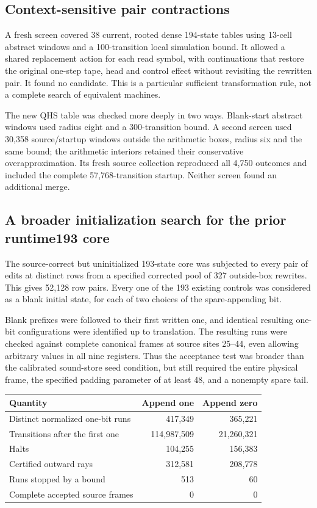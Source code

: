 \subsection{Context-sensitive pair contractions}

A fresh screen covered 38 current, rooted dense 194-state tables using
13-cell abstract windows and a 100-transition local simulation bound.
It allowed a shared replacement action for each read symbol, with
continuations that restore the original one-step tape, head and control
effect without revisiting the rewritten pair. It found no candidate.
This is a particular sufficient transformation rule, not a complete
search of equivalent machines.

The new QHS table was checked more deeply in two ways. Blank-start
abstract windows used radius eight and a 300-transition bound. A second
screen used 30,358 source/startup windows outside the arithmetic boxes,
radius six and the same bound; the arithmetic interiors retained their
conservative overapproximation. Its fresh source collection reproduced
all 4,750 outcomes and included the complete 57,768-transition startup.
Neither screen found an additional merge.

\subsection{A broader initialization search for the prior runtime193 core}

The source-correct but uninitialized 193-state core was subjected to
every pair of edits at distinct rows from a specified corrected pool
of 327 outside-box rewrites. This gives 52,128 row pairs. Every one
of the 193 existing controls was considered as a blank initial state,
for each of two choices of the spare-appending bit.

Blank prefixes were followed to their first written one, and identical
resulting one-bit configurations were identified up to translation.
The resulting runs were checked against complete canonical frames at
source sites 25--44, even allowing arbitrary values in all nine
registers. Thus the acceptance test was broader than the calibrated
sound-store seed condition, but still required the entire physical
frame, the specified padding parameter of at least 48, and a nonempty
spare tail.

\begin{center}\small
\begin{tabular}{@{}lrr@{}}
\toprule Quantity & Append one & Append zero\\\midrule
Distinct normalized one-bit runs &417,349&365,221\\
Transitions after the first one &114,987,509&21,260,321\\
Halts &104,255&156,383\\
Certified outward rays &312,581&208,778\\
Runs stopped by a bound &513&60\\
Complete accepted source frames &0&0\\
\bottomrule
\end{tabular}
\end{center}

